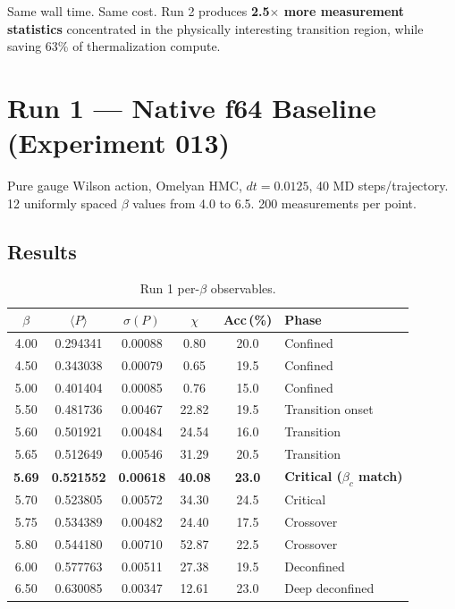 \documentclass[11pt,a4paper]{article}
\newcommand{\plaq}{\langle P \rangle}
\newcommand{\schi}{\chi}
\newcommand{\btc}{\beta_c}
\begin{document}
Same wall time.  Same cost.  Run 2 produces \textbf{2.5$\times$ more
measurement statistics} concentrated in the physically interesting transition
region, while saving 63\% of thermalization compute.

\FloatBarrier
\section{Run 1 --- Native f64 Baseline (Experiment 013)}

Pure gauge Wilson action, Omelyan HMC, $dt = 0.0125$, 40 MD steps/trajectory.
12 uniformly spaced $\beta$ values from 4.0 to 6.5.  200 measurements per
point.

\subsection{Results}

\begin{table}[H]
\centering
\caption{Run 1 per-$\beta$ observables.}
\label{tab:run1}
\renewcommand{\arraystretch}{1.25}
\begin{tabular}{cccccl}
\toprule
$\beta$ & $\plaq$ & $\sigma(P)$ & $\schi$ & Acc\,(\%) & Phase \\
\midrule
4.00 & 0.294341 & 0.00088 & 0.80  & 20.0 & Confined \\
4.50 & 0.343038 & 0.00079 & 0.65  & 19.5 & Confined \\
5.00 & 0.401404 & 0.00085 & 0.76  & 15.0 & Confined \\
5.50 & 0.481736 & 0.00467 & 22.82 & 19.5 & Transition onset \\
5.60 & 0.501921 & 0.00484 & 24.54 & 16.0 & Transition \\
5.65 & 0.512649 & 0.00546 & 31.29 & 20.5 & Transition \\
\textbf{5.69} & \textbf{0.521552} & \textbf{0.00618} & \textbf{40.08} &
  \textbf{23.0} & \textbf{Critical ($\btc$ match)} \\
5.70 & 0.523805 & 0.00572 & 34.30 & 24.5 & Critical \\
5.75 & 0.534389 & 0.00482 & 24.40 & 17.5 & Crossover \\
5.80 & 0.544180 & 0.00710 & 52.87 & 22.5 & Crossover \\
6.00 & 0.577763 & 0.00511 & 27.38 & 19.5 & Deconfined \\
6.50 & 0.630085 & 0.00347 & 12.61 & 23.0 & Deep deconfined \\
\bottomrule
\end{tabular}
\end{table}
\end{document}
